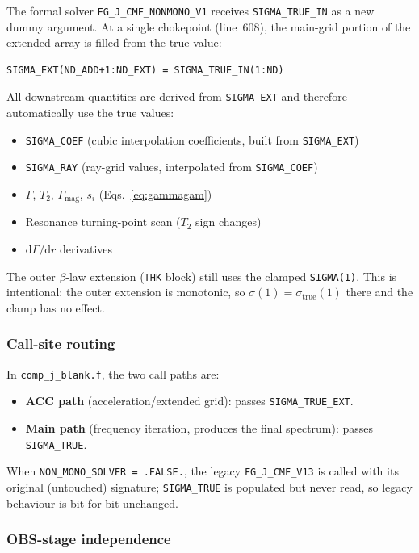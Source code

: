 \documentclass[11pt,a4paper]{article}
\begin{document}
The formal solver \texttt{FG\_J\_CMF\_NONMONO\_V1} receives
\texttt{SIGMA\_TRUE\_IN} as a new dummy argument.  At a single
chokepoint (line~608), the main-grid portion of the extended array is
filled from the true value:
\begin{lstlisting}
SIGMA_EXT(ND_ADD+1:ND_EXT) = SIGMA_TRUE_IN(1:ND)
\end{lstlisting}
All downstream quantities are derived from \texttt{SIGMA\_EXT} and
therefore automatically use the true values:
\begin{itemize}[noitemsep]
  \item \texttt{SIGMA\_COEF} (cubic interpolation coefficients, built from
        \texttt{SIGMA\_EXT})
  \item \texttt{SIGMA\_RAY} (ray-grid values, interpolated from
        \texttt{SIGMA\_COEF})
  \item $\Gamma$, $T_2$, $\Gamma_{\mathrm{mag}}$, $s_i$
        (Eqs.~\ref{eq:gammagam})
  \item Resonance turning-point scan ($T_2$ sign changes)
  \item $\mathrm{d}\Gamma/\mathrm{d}r$ derivatives
\end{itemize}

The outer $\beta$-law extension (\texttt{THK} block) still uses the
clamped \texttt{SIGMA(1)}.  This is intentional: the outer extension is
monotonic, so $\sigma(1) = \sigma_{\mathrm{true}}(1)$ there and the clamp
has no effect.

\subsubsection{Call-site routing}

In \texttt{comp\_j\_blank.f}, the two call paths are:
\begin{itemize}[noitemsep]
  \item \textbf{ACC path} (acceleration/extended grid): passes
        \texttt{SIGMA\_TRUE\_EXT}.
  \item \textbf{Main path} (frequency iteration, produces the final
        spectrum): passes \texttt{SIGMA\_TRUE}.
\end{itemize}
When \texttt{NON\_MONO\_SOLVER = .FALSE.}, the legacy
\texttt{FG\_J\_CMF\_V13} is called with its original (untouched)
signature; \texttt{SIGMA\_TRUE} is populated but never read, so legacy
behaviour is bit-for-bit unchanged.

\subsubsection{OBS-stage independence}
\end{document}
